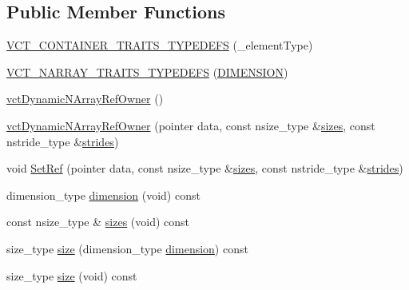 \subsection*{Public Member Functions}
\begin{DoxyCompactItemize}
\item 
\hyperlink{classvct_dynamic_n_array_ref_owner_ae30da698c308bc111e045b687e727fe7}{V\-C\-T\-\_\-\-C\-O\-N\-T\-A\-I\-N\-E\-R\-\_\-\-T\-R\-A\-I\-T\-S\-\_\-\-T\-Y\-P\-E\-D\-E\-F\-S} (\-\_\-element\-Type)
\item 
\hyperlink{classvct_dynamic_n_array_ref_owner_ad0078ba87c8ae67f68d4fbb64f1e7999}{V\-C\-T\-\_\-\-N\-A\-R\-R\-A\-Y\-\_\-\-T\-R\-A\-I\-T\-S\-\_\-\-T\-Y\-P\-E\-D\-E\-F\-S} (\hyperlink{classvct_dynamic_n_array_ref_owner_a80e01cf6b29f06f8909c10a950de8878a189e6a50792859079c88592f0c2ab19b}{D\-I\-M\-E\-N\-S\-I\-O\-N})
\item 
\hyperlink{classvct_dynamic_n_array_ref_owner_a6e49b5e70c0f7d8a6f02d75a705d4ec5}{vct\-Dynamic\-N\-Array\-Ref\-Owner} ()
\item 
\hyperlink{classvct_dynamic_n_array_ref_owner_a67e4c69b9e69c4d580fddfac23fb2d01}{vct\-Dynamic\-N\-Array\-Ref\-Owner} (pointer data, const nsize\-\_\-type \&\hyperlink{classvct_dynamic_n_array_ref_owner_a97f28bacda75aa99b650610c81e5e38b}{sizes}, const nstride\-\_\-type \&\hyperlink{classvct_dynamic_n_array_ref_owner_ac7334601eafc3a0ec9d7801ade2fbf6f}{strides})
\item 
void \hyperlink{classvct_dynamic_n_array_ref_owner_aedba684cf915850bbbcfe5bb976b5a6a}{Set\-Ref} (pointer data, const nsize\-\_\-type \&\hyperlink{classvct_dynamic_n_array_ref_owner_a97f28bacda75aa99b650610c81e5e38b}{sizes}, const nstride\-\_\-type \&\hyperlink{classvct_dynamic_n_array_ref_owner_ac7334601eafc3a0ec9d7801ade2fbf6f}{strides})
\item 
dimension\-\_\-type \hyperlink{classvct_dynamic_n_array_ref_owner_ade9ee32661cd3ff7408e93b15ba7e1db}{dimension} (void) const 
\item 
const nsize\-\_\-type \& \hyperlink{classvct_dynamic_n_array_ref_owner_a97f28bacda75aa99b650610c81e5e38b}{sizes} (void) const 
\item 
size\-\_\-type \hyperlink{classvct_dynamic_n_array_ref_owner_ae02036d7af57fbae121a822f369fb92a}{size} (dimension\-\_\-type \hyperlink{classvct_dynamic_n_array_ref_owner_ade9ee32661cd3ff7408e93b15ba7e1db}{dimension}) const 
\item 
size\-\_\-type \hyperlink{classvct_dynamic_n_array_ref_owner_a1a3a3e3120ad932a59eb278e852c57f4}{size} (void) const 

\end{DoxyCompactItemize}
